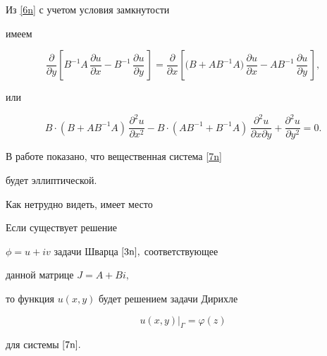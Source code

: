 Из \eqref{6n} с учетом условия замкнутости

имеем

$$

\frac{\partial }{\partial y}\left[B^{-1}A\,\frac{\partial u}{\partial x}

-B^{-1}\,\frac{\partial u}{\partial y}\,\right]=

\frac{\partial }{\partial x}\left[\bigr(B+AB^{-1}A\bigr)\,

\frac{\partial u}{\partial x}-

AB^{-1}\,\frac{\partial u}{\partial y}\,\right],

$$

или

 \begin{equation}

 B\cdot(B+AB^{-1}A)\,\frac{\partial^2 u}{\partial x^2}-B\cdot

 (AB^{-1}+B^{-1}A)\,\frac{\partial^2 u}{\partial x\partial y}

 +\frac{\partial^2 u}{\partial y^2}=0.

 \label{7n}

\end{equation}



В работе \cite{2Nk-Nk2} показано, что   вещественная система \eqref{7n}

будет эллиптической.

Как нетрудно видеть, имеет место



\smallskip





\hypertarget{nik:lemma1}{}



\begin{lemma}[1]Если  существует решение

 $\phi=u+iv$ задачи Шварца $\eqref{3n},$ соответствующее

 данной матрице $J=A+Bi,$

то функция $u(x,y)$ будет решением  задачи Дирихле

\begin{equation}

u(x,y)\bigr|_\Gamma=\varphi(z)

\label{8n}

\end{equation}

для системы $\eqref{7n}.$

\end{lemma}



